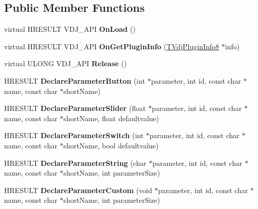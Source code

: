 \subsection*{Public Member Functions}
\begin{DoxyCompactItemize}
\item 
\mbox{\label{classIVdjPlugin8_a3d8f43115ff34854656ba49ea23cf539}} 
virtual H\+R\+E\+S\+U\+LT V\+D\+J\+\_\+\+A\+PI {\bfseries On\+Load} ()
\item 
\mbox{\label{classIVdjPlugin8_a5786b8ff044662a490cd0d357d792aa3}} 
virtual H\+R\+E\+S\+U\+LT V\+D\+J\+\_\+\+A\+PI {\bfseries On\+Get\+Plugin\+Info} (\hyperlink{structTVdjPluginInfo8}{T\+Vdj\+Plugin\+Info8} $\ast$info)
\item 
\mbox{\label{classIVdjPlugin8_a244c0f64c417bbf6939b7124e3d02fae}} 
virtual U\+L\+O\+NG V\+D\+J\+\_\+\+A\+PI {\bfseries Release} ()
\item 
\mbox{\label{classIVdjPlugin8_a2bae319b61a5cecb78278983f5efa90d}} 
H\+R\+E\+S\+U\+LT {\bfseries Declare\+Parameter\+Button} (int $\ast$parameter, int id, const char $\ast$name, const char $\ast$short\+Name)
\item 
\mbox{\label{classIVdjPlugin8_ac8981776c1c8a27049c4fbf13c6bfb4c}} 
H\+R\+E\+S\+U\+LT {\bfseries Declare\+Parameter\+Slider} (float $\ast$parameter, int id, const char $\ast$name, const char $\ast$short\+Name, float defaultvalue)
\item 
\mbox{\label{classIVdjPlugin8_a24d43202c1ef7f867c64325f0e59abd3}} 
H\+R\+E\+S\+U\+LT {\bfseries Declare\+Parameter\+Switch} (int $\ast$parameter, int id, const char $\ast$name, const char $\ast$short\+Name, bool defaultvalue)
\item 
\mbox{\label{classIVdjPlugin8_a5ec6f3e2448054700f05d0ff15efd007}} 
H\+R\+E\+S\+U\+LT {\bfseries Declare\+Parameter\+String} (char $\ast$parameter, int id, const char $\ast$name, const char $\ast$short\+Name, int parameter\+Size)
\item 
\mbox{\label{classIVdjPlugin8_aa9c38ce43050710f555ee94ccb16de65}} 
H\+R\+E\+S\+U\+LT {\bfseries Declare\+Parameter\+Custom} (void $\ast$parameter, int id, const char $\ast$name, const char $\ast$short\+Name, int parameter\+Size)

\end{DoxyCompactItemize}
